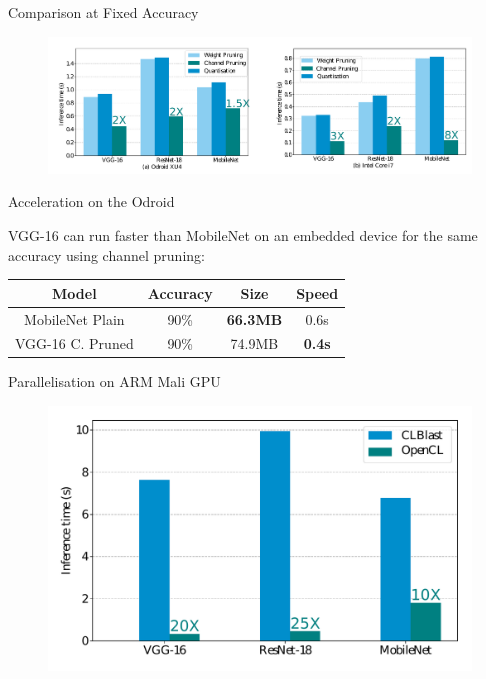 \documentclass[xcolor=dvipsnames]{beamer}
\begin{document}
\begin{frame}{Comparison at Fixed Accuracy}
    \begin{figure}
        \centering
        \includegraphics[width=\linewidth]{images/inf-mem2.pdf}
        \label{fig:inf-mem}
    \end{figure}
\end{frame}


\begin{frame}{Acceleration on the Odroid}
    
VGG-16 can run faster than MobileNet on an embedded device for the same accuracy using channel pruning:
    
\begin{center}
    \begin{tabular}{c|c|c|c}
         Model & Accuracy & Size & Speed \\
         \hline
         MobileNet Plain  & 90\% & \textbf{66.3MB}  & 0.6s \\
         VGG-16 C. Pruned & 90\% & 74.9MB  & \textbf{0.4s}\\
    \end{tabular}
\end{center}
  
\end{frame}

\begin{frame}{Parallelisation on ARM Mali GPU}

    \begin{figure}
        \centering
        \includegraphics[width=\linewidth]{images/Odroid-GPU.pdf}
        \label{fig:odroid-gpu}
    \end{figure}
    
\end{frame}
\end{document}

